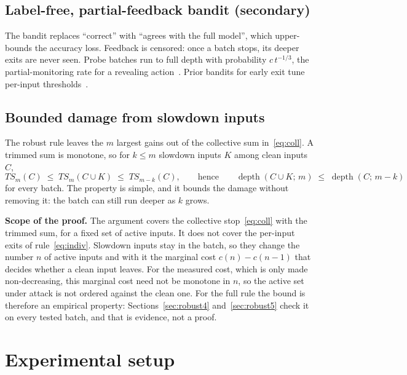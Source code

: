 \subsection{Label-free, partial-feedback bandit (secondary)}\label{sec:bandit}
The bandit replaces ``correct'' with ``agrees with the full model'', which upper-bounds the accuracy loss. Feedback is
censored: once a batch stops, its deeper exits are never seen. Probe batches run to full depth with probability
$c\,t^{-1/3}$, the partial-monitoring rate for a revealing action~\cite{labeleff}. Prior bandits for early exit
tune per-input thresholds~\cite{ceebert,ucbee}.

\subsection{Bounded damage from slowdown inputs}\label{sec:robust}
The robust rule leaves the $m$ largest gains out of the collective sum in~\eqref{eq:coll}. A trimmed sum is
monotone, so for $k\le m$ slowdown inputs $K$ among clean inputs $C$,
\[
  TS_m(C) \;\le\; TS_m(C\cup K) \;\le\; TS_{m-k}(C), \qquad\text{hence}\qquad
  \operatorname{depth}(C\cup K;\,m) \;\le\; \operatorname{depth}(C;\,m-k)
\]
for every batch. The property is simple, and it bounds the damage without removing it: the batch can still run
deeper as $k$ grows.

\textbf{Scope of the proof.} The argument covers the collective stop~\eqref{eq:coll} with the trimmed sum, for a
fixed set of active inputs. It does not cover the per-input exits of rule~\eqref{eq:indiv}. Slowdown inputs stay in
the batch, so they change the number $n$ of active inputs and with it the marginal cost $c(n)-c(n-1)$ that decides
whether a clean input leaves. For the measured cost, which is only made non-decreasing, this marginal cost need not
be monotone in $n$, so the active set under attack is not ordered against the clean one. For the full rule the bound
is therefore an empirical property: Sections~\ref{sec:robust4} and~\ref{sec:robust5} check it on every tested batch, and that is
evidence, not a proof.

\section{Experimental setup}\label{sec:setup}

